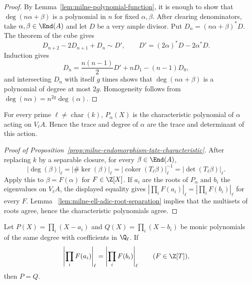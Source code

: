 \begin{proof}
By Lemma~\ref{lem:milne-polynomial-function}, it is enough to show that
$\deg(n\alpha+\beta)$ is a polynomial in $n$ for fixed $\alpha,\beta$.
After clearing denominators, take $\alpha,\beta\in\End(A)$ and let $D$ be a
very ample divisor.  Put $D_n=(n\alpha+\beta)^*D$.  The theorem of the cube
gives
\[
  D_{n+2}-2D_{n+1}+D_n\sim D',
  \qquad D'=(2\alpha)^*D-2\alpha^*D.
\]
Induction gives
\[
 D_n=\frac{n(n-1)}2D'+nD_1-(n-1)D_0,
\]
and intersecting $D_n$ with itself $g$ times shows that
$\deg(n\alpha+\beta)$ is a polynomial of degree at most $2g$.  Homogeneity
follows from $\deg(n\alpha)=n^{2g}\deg(\alpha)$.
\end{proof}

\begin{proposition}
\label{prop:milne-endomorphism-tate-characteristic}

For every prime $\ell\ne\operatorname{char}(k)$, $P_\alpha(X)$ is the
characteristic polynomial of $\alpha$ acting on $V_\ell A$.  Hence the trace
and degree of $\alpha$ are the trace and determinant of this action.
\end{proposition}

\begin{proof}[Proof of Proposition~\ref{prop:milne-endomorphism-tate-characteristic}]
After replacing $k$ by a separable closure, for every $\beta\in\End(A)$,
\[
|\deg(\beta)|_\ell=|\#\ker(\beta)|_\ell
 =|\operatorname{coker}(T_\ell\beta)|_\ell^{-1}
 =|\det(T_\ell\beta)|_\ell.
\]
Apply this to $\beta=F(\alpha)$ for $F\in\Z[X]$.  If $a_i$ are the roots of
$P_\alpha$ and $b_i$ the eigenvalues on $V_\ell A$, the displayed equality
gives $|\prod_iF(a_i)|_\ell=|\prod_iF(b_i)|_\ell$ for every $F$.  Lemma~
\ref{lem:milne-ell-adic-root-separation} implies that the multisets of roots
agree, hence the characteristic polynomials agree.
\end{proof}

\begin{lemma}
\label{lem:milne-ell-adic-root-separation}

Let $P(X)=\prod_i(X-a_i)$ and $Q(X)=\prod_i(X-b_i)$ be monic polynomials
of the same degree with coefficients in $\Q_\ell$.  If
\[
\left|\prod_iF(a_i)\right|_\ell
=\left|\prod_iF(b_i)\right|_\ell
\qquad(F\in\Z[T]),
\]
then $P=Q$.
\end{lemma}

